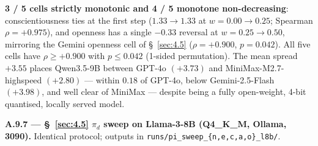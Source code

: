 \begin{table}[t]
\centering
{}
\caption{$\pi_d$ sweep on Qwen3.5-9B Q4 served via Ollama on a single 3090. 3 / 5 cells strictly monotonic, 4 / 5 monotone non-decreasing; mean spread $+3.55$ places the open-weight Qwen3.5-9B between GPT-4o ($+3.73$) and MiniMax-M2.7-highspeed ($+2.80$), within $0.18$ of GPT-4o.}
\label{tab:pi-qwen}
\end{table}

\textbf{3 / 5 cells strictly monotonic and 4 / 5 monotone non-decreasing}: conscientiousness ties at the first step ($1.33 \to 1.33$ at $w{=}0.00{\to}0.25$; Spearman $\rho{=}+0.975$), and openness has a single $-0.33$ reversal at $w{=}0.25{\to}0.50$, mirroring the Gemini openness cell of \S~\ref{sec:4.5} ($\rho{=}+0.900$, $p{=}0.042$). All five cells have $\rho \geq +0.900$ with $p \leq 0.042$ (1-sided permutation). The mean spread $+3.55$ places Qwen3.5-9B between GPT-4o $(+3.73)$ and MiniMax-M2.7-highspeed $(+2.80)$ --- within $0.18$ of GPT-4o, below Gemini-2.5-Flash $(+3.98)$, and well clear of MiniMax --- despite being a fully open-weight, 4-bit quantised, locally served model.

\label{app:A.9.7}
\textbf{A.9.7 --- \S~\ref{sec:4.5} $\pi_d$ sweep on Llama-3-8B (Q4\_K\_M, Ollama, 3090).} Identical protocol; outputs in \texttt{runs/\allowbreak{}pi\_\allowbreak{}sweep\_\allowbreak{}\{n,\allowbreak{}e,\allowbreak{}c,\allowbreak{}a,\allowbreak{}o\}\_\allowbreak{}l8b/\allowbreak{}}.

